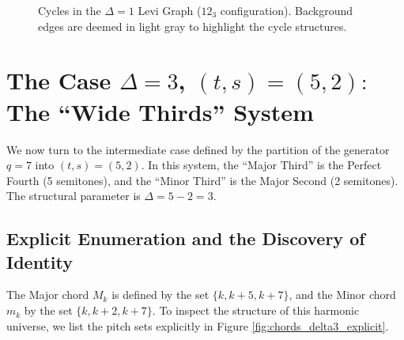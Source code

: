 \documentclass[12pt,letterpaper]{amsart}
\begin{document}
\begin{figure}[H]
\begin{minipage}{0.48\textwidth}
    \end{minipage}

    \caption{\scriptsize Cycles in the \texorpdfstring{$\Delta=1$}{Delta=1} Levi Graph ($12_3$ configuration). Background edges are deemed in light gray to highlight the cycle structures.}
    \label{fig:levi12_cycles}
\end{figure}

\section{The Case $\Delta=3$, $(t,s)=(5,2):$ The ``Wide Thirds'' System}

We now turn to the intermediate case defined by the partition of the generator $q=7$ into $(t, s) = (5, 2)$. In this system, the ``Major Third'' is the Perfect Fourth (5 semitones), and the ``Minor Third'' is the Major Second (2 semitones). The structural parameter is $\Delta = 5 - 2 = 3$.

\subsection{Explicit Enumeration and the Discovery of Identity}
The Major chord $M_k$ is defined by the set $\{k, k+5, k+7\}$, and the Minor chord $m_k$ by the set $\{k, k+2, k+7\}$. To inspect the structure of this harmonic universe, we list the pitch sets explicitly in Figure \ref{fig:chords_delta3_explicit}.
\end{document}
